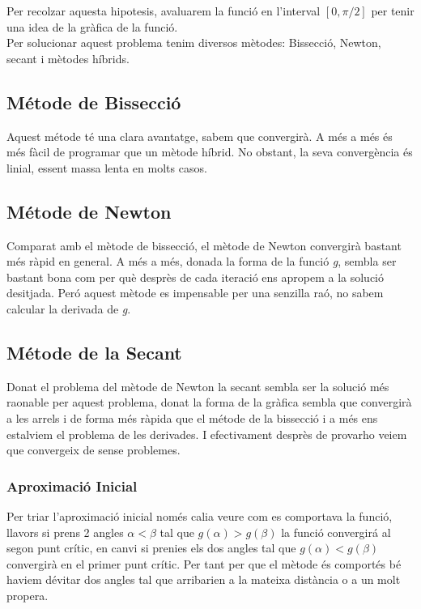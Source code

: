 \documentclass{article}
\begin{document}
Per recolzar aquesta hipotesis, avaluarem la funció en l'interval $[0,\pi/2]$ per tenir una idea de la gr\`afica de la funci\'o. 
\\

Per solucionar aquest problema tenim diversos m\`etodes: Bissecci\'o, Newton, secant i m\`etodes h\'ibrids.

\subsection*{M\'etode de Bissecci\'o}
\quad Aquest m\'etode t\'e una clara avantatge, sabem que convergir\`a. A més a m\'es és més f\`acil de programar que un m\`etode h\'ibrid. No obstant, la seva convergència és linial, essent massa lenta en molts casos.

\subsection*{M\'etode de Newton}
\quad Comparat amb el m\`etode de bissecci\'o, el mètode de Newton convergir\`a bastant m\'es r\`apid en general. A més a més, donada la forma de la funci\'o \emph{g}, sembla ser bastant bona com per qu\`e despr\`es de cada iteraci\'o ens apropem a la soluci\'o desitjada. Per\'o aquest m\`etode es impensable per una senzilla ra\'o, no sabem calcular la derivada de \emph{g}.

\subsection*{M\'etode de la Secant}
\quad Donat el problema del m\`etode de Newton la secant sembla ser la soluci\'o m\'es raonable per aquest problema, donat la forma de la gr\`afica sembla que convergir\`a a les arrels i de forma m\'es r\`apida que el m\'etode de la bissecci\'o i a m\'es ens estalviem el problema de les derivades. I efectivament despr\`es de provarho veiem que convergeix de sense problemes. 
\subsubsection*{Aproximaci\'o Inicial}
\quad Per triar l'aproximaci\'o inicial nom\'es calia veure com es comportava la funci\'o, llavors si prens 2 angles $\alpha < \beta$ tal que $ g(\alpha) > g(\beta) $ la funci\'o convergir\'a al segon punt cr\'itic, en canvi si prenies els dos angles tal que $ g(\alpha) < g(\beta) $ convergir\`a en el primer punt cr\'itic. Per tant per que el m\`etode \'es comport\'es b\'e haviem d\'evitar dos angles tal que arribarien a la mateixa dist\`ancia o a un molt propera.
\end{document}
